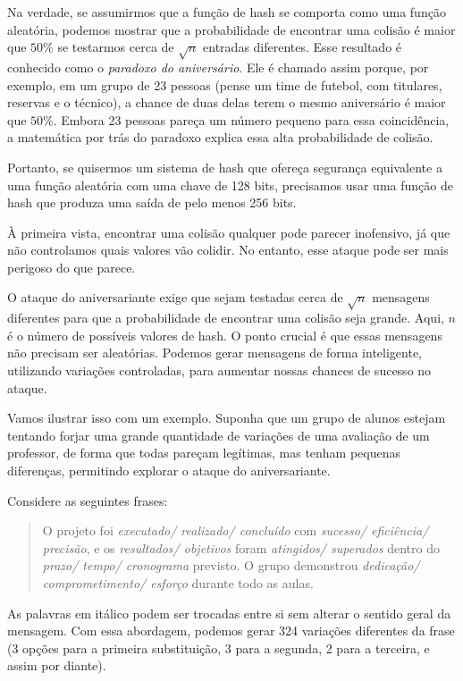 Na verdade, se assumirmos que a função de hash se comporta como uma função aleatória, podemos mostrar que a probabilidade de encontrar uma colisão é maior que $50\%$ se testarmos cerca de $\sqrt{n}$ entradas diferentes.
Esse resultado é conhecido como o {\em paradoxo do aniversário}.
Ele é chamado assim porque, por exemplo, em um grupo de 23 pessoas (pense um time de futebol, com titulares, reservas e o técnico), a chance de duas delas terem o mesmo aniversário é maior que $50\%$.
Embora 23 pessoas pareça um número pequeno para essa coincidência, a matemática por trás do paradoxo explica essa alta probabilidade de colisão.

Portanto, se quisermos um sistema de hash que ofereça segurança equivalente a uma função aleatória com uma chave de 128 bits, precisamos usar uma função de hash que produza uma saída de pelo menos 256 bits.

À primeira vista, encontrar uma colisão qualquer pode parecer inofensivo, já que não controlamos quais valores vão colidir.
No entanto, esse ataque pode ser mais perigoso do que parece.

O ataque do aniversariante exige que sejam testadas cerca de $\sqrt{n}$ mensagens diferentes para que a probabilidade de encontrar uma colisão seja grande.
Aqui, $n$ é o número de possíveis valores de hash.
O ponto crucial é que essas mensagens não precisam ser aleatórias.
Podemos gerar mensagens de forma inteligente, utilizando variações controladas, para aumentar nossas chances de sucesso no ataque.


Vamos ilustrar isso com um exemplo.
Suponha que um grupo de alunos estejam tentando forjar uma grande quantidade de variações de uma avaliação de um professor, de forma que todas pareçam legítimas, mas tenham pequenas diferenças, permitindo explorar o ataque do aniversariante.

Considere as seguintes frases:

\begin{quote}
  O projeto foi {\em executado/ realizado/ concluído} com {\em sucesso/ eficiência/ precisão}, e os {\em resultados/ objetivos} foram {\em atingidos/ superados} dentro do {\em prazo/ tempo/ cronograma} previsto.
  O grupo demonstrou {\em dedicação/ comprometimento/ esforço} durante todo as aulas.
\end{quote}

As palavras em itálico podem ser trocadas entre si sem alterar o sentido geral da mensagem.
Com essa abordagem, podemos gerar 324 variações diferentes da frase (3 opções para a primeira substituição, 3 para a segunda, 2 para a terceira, e assim por diante).

